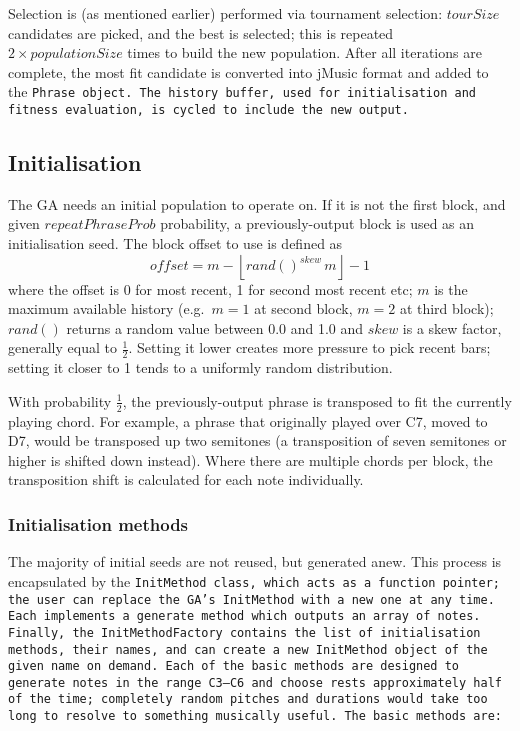 Selection is (as mentioned earlier) performed via tournament selection: $tourSize$ candidates are picked, and the best is selected; this is repeated $2 \times populationSize$ times to build the new population. After all iterations are complete, the most fit candidate is converted into jMusic format and added to the \tt{Phrase} object. The history buffer, used for initialisation and fitness evaluation, is cycled to include the new output.

\subsection{Initialisation}

The GA needs an initial population to operate on. If it is not the first block, and given $repeatPhraseProb$ probability, a previously-output block is used as an initialisation seed. The block offset to use is defined as \[ offset = m - \left\lfloor rand()^{skew}\, m \right\rfloor - 1 \] where the offset is 0 for most recent, 1 for second most recent etc; $m$ is the maximum available history (e.g.\ $m = 1$ at second block, $m = 2$ at third block); $rand()$ returns a random value between 0.0 and 1.0 and $skew$ is a skew factor, generally equal to $\frac{1}{2}$. Setting it lower creates more pressure to pick recent bars; setting it closer to 1 tends to a uniformly random distribution.

With probability $\frac{1}{2}$, the previously-output phrase is transposed to fit the currently playing chord. For example, a phrase that originally played over C7, moved to D7, would be transposed up two semitones (a transposition of seven semitones or higher is shifted down instead). Where there are multiple chords per block, the transposition shift is calculated for each note individually.

\subsubsection{Initialisation methods}

The majority of initial seeds are not reused, but generated anew. This process is encapsulated by the \tt{InitMethod} class, which acts as a function pointer; the user can replace the GA's \tt{InitMethod} with a new one at any time. Each implements a \tt{generate} method which outputs an array of notes. Finally, the \tt{InitMethodFactory} contains the list of initialisation methods, their names, and can create a new \tt{InitMethod} object of the given name on demand. Each of the basic methods are designed to generate notes in the range C3--C6 and choose rests approximately half of the time; completely random pitches and durations would take too long to resolve to something musically useful. The basic methods are:

